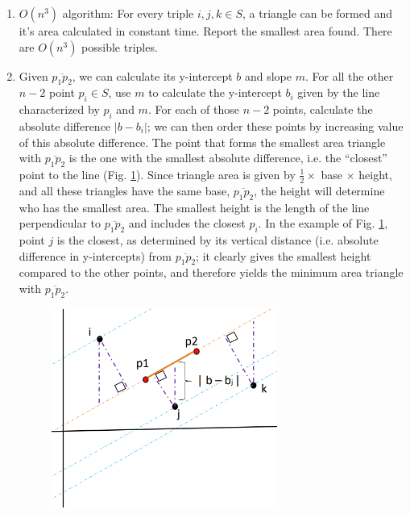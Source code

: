 \documentclass [12pt]{article}
\begin{document}
    \begin{enumerate}[label=\alph*.]
        \item $O(n^3)$ algorithm: For every triple $i, j, k\in S$, a triangle can be formed and it's area calculated in constant time. Report the smallest area found. There are $O(n^3)$ possible triples.
        
        \item Given $\overline{p_1 p_2}$, we can calculate its y-intercept $b$ and slope $m$. For all the other $n-2$ point $p_i\in S$, use $m$ to calculate the y-intercept $b_i$ given by the line characterized by $p_i$ and $m$. For each of those $n-2$ points, calculate the absolute difference $|b - b_i|$; we can then order these points by increasing value of this absolute difference. The point that forms the smallest area triangle with $\overline{p_1 p_2}$ is the one with the smallest absolute difference, i.e. the ``closest'' point to the line (Fig. \ref{fig:2b}). Since triangle area is given by $\frac{1}{2} \times $ base $\times$ height, and all these triangles have the same base, $\overline{p_1 p_2}$, the height will determine who has the smallest area. The smallest height is the length of the line perpendicular to $\overline{p_1 p_2}$ and includes the closest $p_i$. In the example of Fig. \ref{fig:2b}, point $j$ is the closest, as determined by its vertical distance (i.e. absolute difference in y-intercepts) from $\overline{p_1 p_2}$; it clearly gives the smallest height compared to the other points, and therefore yields the minimum area triangle with $\overline{p_1 p_2}$.
        

        \begin{figure}[h]
            \centering
            \includegraphics[width=0.7\textwidth]{images/2b.PNG}
            \caption {}
            \label{fig:2b}
        \end{figure}


\end{enumerate}
\end{document}
